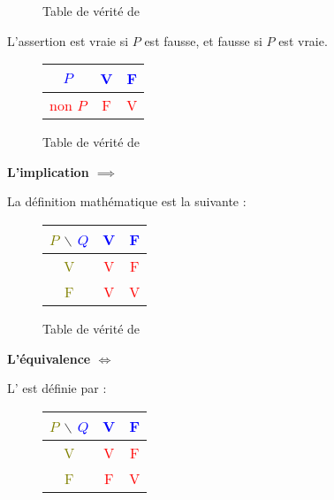 \documentclass[10pt,class=article,crop=false]{standalone}
\begin{document}
\begin{multicols}{2}
\begin{figure}[H]
	{Table de vérité de }
\end{figure}


L'assertion  est vraie si $P$ est fausse, et fausse si $P$ est vraie.

\begin{figure}[H]
	\centering
	\begin{tabular}{c|c|c}
		\textcolor{blue}{$P$}  &  \textcolor{blue}{V} &  \textcolor{blue}{F} \\ \hline
		\textcolor{red}{non $P$}    & \textcolor{red}{F} & \textcolor{red}{V} \\
	\end{tabular}
	
	{Table de vérité de }
\end{figure}


\textbf{L'implication $\implies$}


La définition mathématique est la suivante :

\begin{figure}[H]
	\centering
	\begin{tabular}{c|c|c}
		\textcolor{olive}{$P$} $\backslash$ \textcolor{blue}{$Q$}  & \textcolor{blue}{V} & \textcolor{blue}{F} \\ \hline
		\textcolor{olive}{V} & \textcolor{red}{V} & \textcolor{red}{F} \\ \hline
		\textcolor{olive}{F} & \textcolor{red}{V} & \textcolor{red}{V} \\
	\end{tabular}
	
	{Table de vérité de }
\end{figure}


\textbf{L'équivalence $\iff$}


L' est définie par :

\begin{figure}[H]
	\centering
	\begin{tabular}{c|c|c}
		\textcolor{olive}{$P$} $\backslash$ \textcolor{blue}{$Q$}  & \textcolor{blue}{V} & \textcolor{blue}{F} \\ \hline
		\textcolor{olive}{V} & \textcolor{red}{V} & \textcolor{red}{F} \\ \hline
		\textcolor{olive}{F} & \textcolor{red}{F} & \textcolor{red}{V} \\
	\end{tabular}
	

\end{figure}
\end{multicols}
\end{document}
